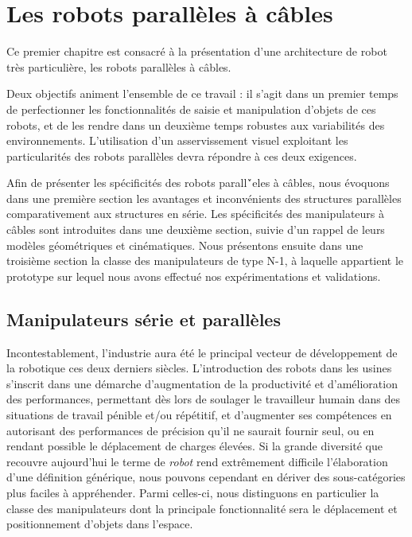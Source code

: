 \chapter{Les robots parall\`eles \`a c\^ables} \label{chap0}

Ce premier chapitre est consacré à la présentation d'une architecture de robot 
très particulière, les robots parall\`eles \`a c\^ables.

Deux objectifs animent l'ensemble de ce travail : il s'agit dans un premier 
temps de perfectionner les fonctionnalités de saisie et manipulation d'objets de 
ces robots, et de les rendre dans un deuxi\`eme temps robustes aux 
variabilit\'es des environnements. L'utilisation d'un asservissement visuel 
exploitant les particularit\'es des robots parall\`eles devra r\'epondre \`a ces 
deux exigences.

Afin de pr\'esenter les sp\'ecificit\'es des robots parall\'`eles \`a c\^ables, 
nous  évoquons dans une première section les avantages et inconvénients des 
structures parallèles comparativement aux structures en série. Les spécificités 
des manipulateurs à c\^ables sont introduites dans une deuxième section, suivie 
d'un rappel de leurs modèles géométriques et cinématiques. Nous présentons 
ensuite dans une troisième section la classe des manipulateurs de type N-1, \`a 
laquelle appartient le prototype sur lequel nous avons effectu\'e nos 
expérimentations et validations.

\section{Manipulateurs série et parallèles} \label{chap0-0}

Incontestablement, l'industrie aura été le principal vecteur de développe\-ment 
de la robotique ces deux derniers siècles. L'introduction des robots dans les 
usines s'inscrit dans une démarche d'augmentation de la productivité et 
d'amélio\-ration des performances, permettant dès lors de soulager le 
travailleur humain dans des situations de travail pénible et/ou répétitif, et 
d'augmenter ses compétences en autorisant des performances de précision qu'il 
ne saurait fournir seul, ou en rendant possible le déplacement de charges 
élevées. Si la grande diversité que recouvre aujourd'hui le terme de {\it robot} 
rend extrêmement difficile l'élaboration d'une définition générique, nous 
pouvons cependant en dériver des sous-catégories plus faciles à appréhender. 
Parmi celles-ci, nous distinguons en particulier la classe des manipulateurs 
dont la principale fonctionnalité sera le déplacement et positionnement 
d'objets dans l'espace.

